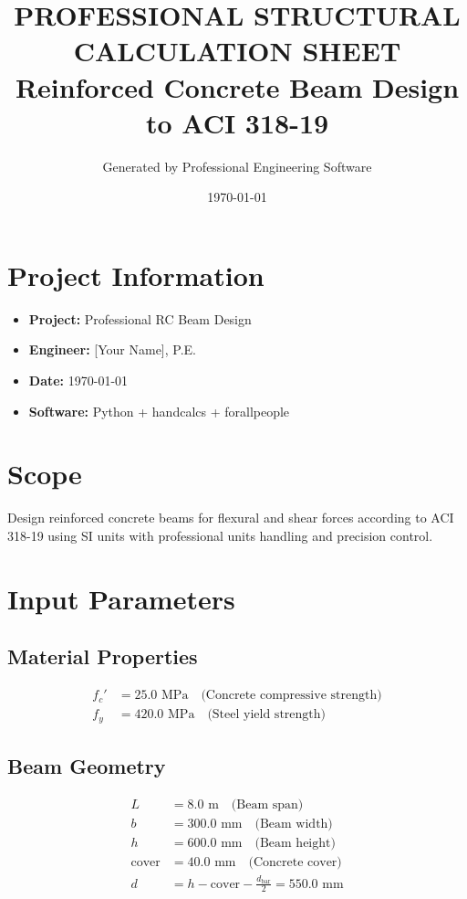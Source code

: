﻿\documentclass[11pt,a4paper]{article}
\title{\textbf{PROFESSIONAL STRUCTURAL CALCULATION SHEET}\\
\large Reinforced Concrete Beam Design to ACI 318-19}
\author{Generated by Professional Engineering Software}
\date{\today}
\begin{document}
\maketitle

\section{Project Information}
\begin{itemize}
\item \textbf{Project:} Professional RC Beam Design
\item \textbf{Engineer:} [Your Name], P.E.
\item \textbf{Date:} \today
\item \textbf{Software:} Python + handcalcs + forallpeople
\end{itemize}

\section{Scope}
Design reinforced concrete beams for flexural and shear forces according to ACI 318-19 using SI units with professional units handling and precision control.

\section{Input Parameters}

\subsection{Material Properties}
\begin{align}
f_c' &= 25.0 \text{ MPa} \quad \text{(Concrete compressive strength)}\\
f_y &= 420.0 \text{ MPa} \quad \text{(Steel yield strength)}
\end{align}

\subsection{Beam Geometry}
\begin{align}
L &= 8.0 \text{ m} \quad \text{(Beam span)}\\
b &= 300.0 \text{ mm} \quad \text{(Beam width)}\\
h &= 600.0 \text{ mm} \quad \text{(Beam height)}\\
\text{cover} &= 40.0 \text{ mm} \quad \text{(Concrete cover)}\\
d &= h - \text{cover} - \frac{d_{\text{bar}}}{2} = 550.0 \text{ mm}
\end{align}
\end{document}
